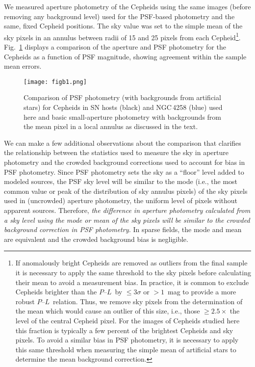 \documentclass[12pt]{aastex631}
\newcommand{\PLs}{$P$--$L$\ }
\begin{document}
\begin{appendices}
We measured aperture photometry of the Cepheids using the same images (before removing any background level) used for the PSF-based photometry and the same, fixed Cepheid positions.  The sky value was set to the simple mean of the sky pixels in an annulus between radii of 15 and 25 pixels from each Cepheid\footnote{If anomalously bright Cepheids are removed as outliers from the final sample it is necessary to apply the same threshold to the sky pixels before calculating their mean to avoid a measurement bias.  In practice, it is common to exclude Cepheids brighter than the \PLs by $\leq 3\sigma$ or $>1$~mag to provide a more robust \PLs relation. Thus, we remove sky pixels from the determination of the mean which would cause an outlier of this size, i.e., those $\geq 2.5 \times$ the level of the central Cepheid pixel.  For the images of Cepheids studied here this fraction is typically a few percent of the brightest Cepheids and sky pixels. To avoid a similar bias in PSF photometry, it is necessary to apply this same threshold when measuring the simple mean of artificial stars to determine the mean background correction.}. Fig.~\ref{fg:apvpsf} displays a comparison of the aperture and PSF photometry for the Cepheids as a function of PSF magnitude, showing agreement within the sample mean errors. 

\begin{figure}[t]   
\begin{center}
\texttt{[image: figb1.png]}
\end{center}
\caption{\label{fg:apvpsf} Comparison of PSF photometry (with backgrounds from artificial stars) for Cepheids in SN hosts (black) and NGC$\,$4258 (blue) used here and basic small-aperture photometry with backgrounds from the mean pixel in a local annulus as discussed in the text.}
\end{figure}

We can make a few additional observations about the comparison that clarifies the relationship between the statistics used to measure the sky in aperture photometry and the crowded background corrections used to account for bias in PSF photometry.  Since PSF photometry sets the sky as a ``floor'' level added to modeled sources, the PSF sky level will be similar to the mode (i.e., the most common value or peak of the distribution of sky annulus pixels) of the sky pixels used in (uncrowded) aperture photometry, the uniform level of pixels without apparent sources.  Therefore, {\it the difference in aperture photometry calculated from a sky level using the mode or mean of the sky pixels will be similar to the crowded background correction in PSF photometry.}  In sparse fields, the mode and mean are equivalent and the crowded background bias is negligible.  


\end{appendices}
\end{document}
